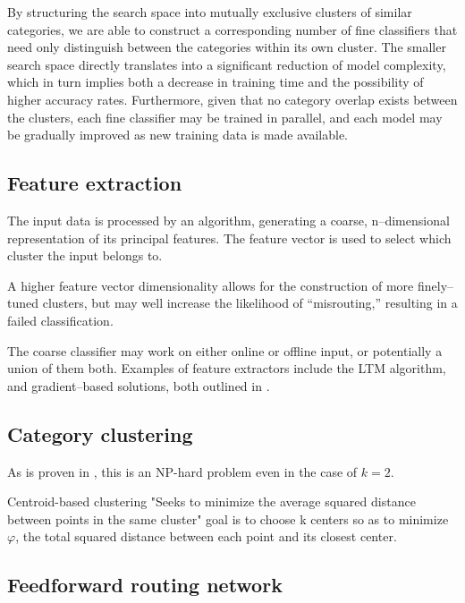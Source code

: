 \documentclass[10pt,conference,a4paper]{IEEEtran}
\begin{document}
	By structuring the search space into mutually exclusive clusters of similar categories,
	we are able to construct a corresponding number of fine classifiers that need only distinguish
	between the categories within its own cluster. The smaller search space directly translates into a
	significant reduction of model complexity, which in turn implies both a decrease in training time
	and the possibility of higher accuracy rates. Furthermore, given that no category overlap exists
	between the clusters, each fine classifier may be trained in parallel, and each model may be gradually
	improved as new training data is made available.




	\subsection{Feature extraction}

	The input data is processed by an algorithm, generating a coarse, n--dimensional representation of its principal features.
	The feature vector is used to select which cluster the input belongs to.
	

	A higher feature vector dimensionality allows for the construction of more finely--tuned clusters, but may well increase
	the likelihood of ``misrouting,'' resulting in a failed classification.

	The coarse classifier may work on either online or offline input, or potentially a union of them both.
	Examples of feature extractors include the LTM algorithm, and gradient--based solutions, both outlined in \cite{tanaka1999hybrid}.



	\subsection{Category clustering}

	As is proven in \cite{drineas2004clustering}, this is an NP-hard problem even in the case of $k = 2$. 

	Centroid-based clustering
	"Seeks to minimize the average squared distance between points in the same cluster"
	goal is to choose k centers so as to minimize $\varphi$, the total squared distance between each point and its closest center.

	\subsection{Feedforward routing network}
\end{document}
